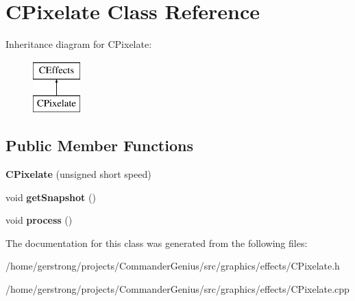 \hypertarget{class_c_pixelate}{
\section{CPixelate Class Reference}
\label{class_c_pixelate}
}
Inheritance diagram for CPixelate:\begin{figure}[H]
\begin{center}
\leavevmode
\includegraphics[height=2cm]{class_c_pixelate}
\end{center}
\end{figure}
\subsection*{Public Member Functions}
\begin{DoxyCompactItemize}
\item 
\hypertarget{class_c_pixelate_a3fd69b309fe39cdca96bbf29347b4186}{
{\bfseries CPixelate} (unsigned short speed)}
\label{class_c_pixelate_a3fd69b309fe39cdca96bbf29347b4186}

\item 
\hypertarget{class_c_pixelate_ae6fca63bb75bd4acf5b1ccb2c9a196b5}{
void {\bfseries getSnapshot} ()}
\label{class_c_pixelate_ae6fca63bb75bd4acf5b1ccb2c9a196b5}

\item 
\hypertarget{class_c_pixelate_a4697746f15c29af9763ca680a5639951}{
void {\bfseries process} ()}
\label{class_c_pixelate_a4697746f15c29af9763ca680a5639951}

\end{DoxyCompactItemize}


The documentation for this class was generated from the following files:\begin{DoxyCompactItemize}
\item 
/home/gerstrong/projects/CommanderGenius/src/graphics/effects/CPixelate.h\item 
/home/gerstrong/projects/CommanderGenius/src/graphics/effects/CPixelate.cpp\end{DoxyCompactItemize}
